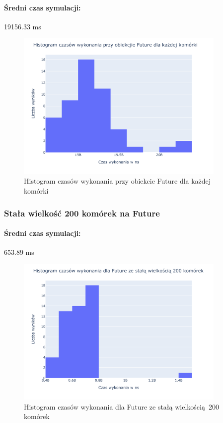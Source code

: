\documentclass{mwart}
\begin{document}
\paragraph{Średni czas symulacji: } 19156.33 ms


\begin{figure}[H]
  \centering
  \includegraphics[width=0.9\textwidth]{Parallel_Future_for_each_cell_game_of_life_performance}
  \caption{Histogram czasów wykonania przy obiekcie Future dla każdej komórki}
\end{figure}

\subsubsection{Stała wielkość 200 komórek na Future}
\paragraph{Średni czas symulacji: } 653.89 ms


\begin{figure}[H]
  \centering
  \includegraphics[width=0.9\textwidth]{Parallel_Future_fix_chunk_200_game_of_life_performance}
  \caption{Histogram czasów wykonania dla Future ze stałą wielkością 200 komórek}
\end{figure}
\end{document}
